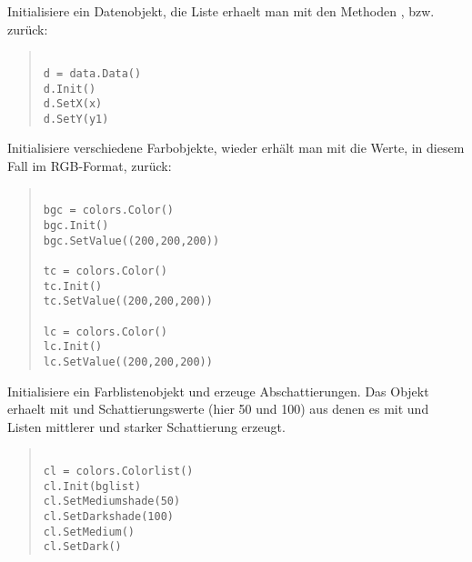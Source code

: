 Initialisiere ein Datenobjekt, die Liste erhaelt man mit den Methoden
, bzw.  zur\"uck:

\begin{small}
\begin{quote}
\begin{verbatim}

d = data.Data()
d.Init()     
d.SetX(x)                          
d.SetY(y1)                         

\end{verbatim}
\end{quote}
\end{small}

Initialisiere verschiedene Farbobjekte, wieder erh\"alt man mit
 die Werte, in diesem Fall im RGB-Format,
zur\"uck:

\begin{small}
\begin{quote}
\begin{verbatim}

bgc = colors.Color()               
bgc.Init()
bgc.SetValue((200,200,200))         
                                    
tc = colors.Color()                
tc.Init()
tc.SetValue((200,200,200))

lc = colors.Color()
lc.Init()
lc.SetValue((200,200,200))

\end{verbatim}
\end{quote}
\end{small}

Initialisiere ein Farblistenobjekt und erzeuge Abschattierungen.  Das
Objekt erhaelt mit  und
 Schattierungswerte (hier 50 und 100) aus
denen es mit  und  Listen
mittlerer und starker Schattierung erzeugt.
  
\begin{small}
\begin{quote}
\begin{verbatim}

cl = colors.Colorlist()      
cl.Init(bglist)
cl.SetMediumshade(50)              
cl.SetDarkshade(100)               
cl.SetMedium()                     
cl.SetDark()

\end{verbatim}
\end{quote}
\end{small}

